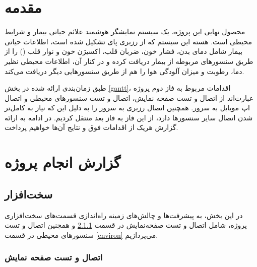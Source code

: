 \documentclass[12pt]{article}
\begin{document}
\newpage
\pagestyle{fancy}
\fancyhf{}
\fancyfoot{}
\cfoot{\thepage}
\chead{}

\newfontfamily{}

\KashidaOff
 \newcommand{\inlineLatin}[1]{
	\small{\lr{{\terminal #1}}}
}


\tableofcontents
\listoffigures

\newpage
\section{مقدمه}


محصول نهایی این پروژه، یک سیستم نمایشگر هوشمند علائم حیاتی بیمار و شرایط محیطی است. هسته این سیستم که از رزبری پای تشکیل شده است، اطلاعات حیاتی بیمار شامل دمای بدن، فشار خون، ضربان قلب، اکسیژن خون و نوار قلب () را از طریق سنسور‌های مربوطه از بیمار دریافت کرده و در کنار آن، اطلاعات محیطی نظیر دما،‌ رطوبت و میزان آلودگی هوا را هم از طریق سنسورهایی دیگر دریافت می‌کند.

طبق زمان‌بندی ارائه شده در بخش \ref{gantt}، اقدامات مربوط به فاز دوم پروژه عبارت‌اند از اتصال و تست صفحه نمایش، اتصال و تست سنسورهای محیطی و اتصال اپ موبایل به سرور. همچنین اتصال رزبری به سرور را به دلیل این که نیاز به کامل‌تر شدن اتصال سایر سنسورها دارد،‌ از این فاز به فاز بعد منتقل کردیم.
در ادامه به ارائه گزارش هریک از اقدامات فوق و نتایج آن‌ها خواهیم پرداخت.

\section{گزارش انجام پروژه}
\subsection{سخت‌افزار}

در این بخش، به پیشرفت‌ها و چالش‌های زمینه راه‌اندازی قسمت‌های سخت‌افزاری پروژه، شامل اتصال و تست صفحه‌نمایش در قسمت \ref{display} و همچنین اتصال و تست سنسور‌های محیطی در قسمت \ref{environ} می‌پردازیم. 

\subsubsection{اتصال و تست صفحه نمایش} \label{display}
\end{document}
